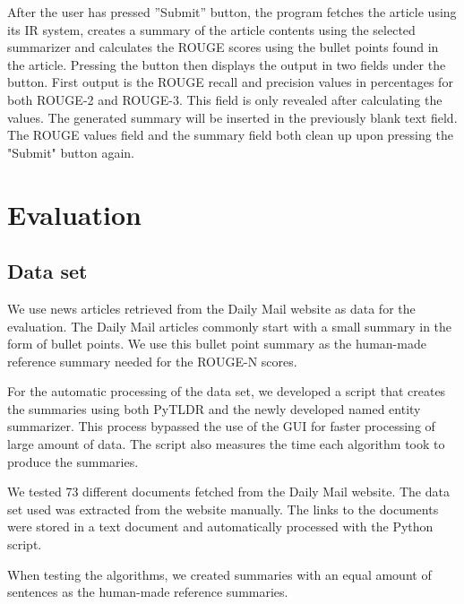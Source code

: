 \documentclass[conference]{IEEEtran}
\begin{document}
After the user has pressed ”Submit” button, the program fetches the article using its IR system, creates a summary of the article contents using the selected summarizer and calculates the ROUGE scores using the bullet points found in the article. Pressing the button then displays the output in two fields under the button. First output is the ROUGE recall and precision values in percentages for both ROUGE-2 and ROUGE-3. This field is only revealed after calculating the values. The generated summary will be inserted in the previously blank text field. The ROUGE values field and the summary field both clean up upon pressing the "Submit" button again.

\section{Evaluation}\label{results}
\subsection{Data set}\label{data}
We use news articles retrieved from the Daily Mail website as data for the evaluation. The Daily Mail articles commonly start with a small summary in the form of bullet points. We use this bullet point summary as the human-made reference summary needed for the ROUGE-N scores. 

For the automatic processing of the data set, we developed a script that creates the summaries using both PyTLDR and the newly developed named entity summarizer. This process bypassed the use of the GUI for faster processing of large amount of data. The script also measures the time each algorithm took to produce the summaries. 

We tested 73 different documents fetched from the Daily Mail website. The data set used was extracted from the website manually. The links to the documents were stored in a text document and automatically processed with the Python script. %

When testing the algorithms, we created summaries with an equal amount of sentences as the human-made reference summaries.
\end{document}
